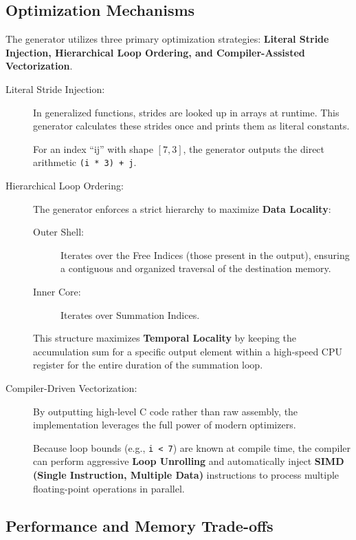 \documentclass[binding=0.6cm]{sapthesis}
\begin{document}
\subsection{Optimization Mechanisms}

The generator utilizes three primary optimization strategies: \textbf{Literal Stride Injection, Hierarchical Loop Ordering, and Compiler-Assisted Vectorization}.

\begin{description}
	\item [Literal Stride Injection:] In generalized functions, strides are looked up in arrays at runtime. This generator calculates these strides once and prints them as literal constants.

	      For an index ``ij'' with shape $[7, 3]$, the generator outputs the direct arithmetic \texttt{(i * 3) + j}.

	\item [Hierarchical Loop Ordering:] The generator enforces a strict hierarchy to maximize \textbf{Data Locality}:
	      \begin{description}
		      \item [Outer Shell:] Iterates over the Free Indices (those present in the output), ensuring a contiguous and organized traversal of the destination memory.
		      \item [Inner Core:] Iterates over Summation Indices.
	      \end{description}
	      This structure maximizes \textbf{Temporal Locality} by keeping the accumulation sum for a specific output element within a high-speed CPU register for the entire duration of the summation loop.

	\item [Compiler-Driven Vectorization:] By outputting high-level C code rather than raw assembly, the implementation leverages the full power of modern optimizers.

	      Because loop bounds (e.g., \texttt{i < 7}) are known at compile time, the compiler can perform aggressive \textbf{Loop Unrolling} and automatically inject \textbf{SIMD (Single Instruction, Multiple Data)} instructions to process multiple floating-point operations in parallel.
\end{description}

\subsection{Performance and Memory Trade-offs}
\end{document}
